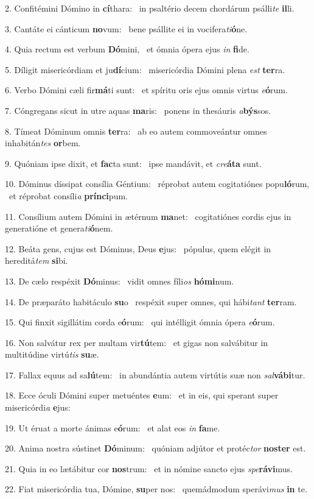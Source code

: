 2. Confitémini Dómino in \textbf{cí}thara: \ast\  in psaltério decem chordárum psálli\textit{te} \textbf{il}li.\

3. Cantáte ei cánticum \textbf{no}vum: \ast\  bene psállite ei in vocifera\textit{ti}\textbf{ó}ne.\

4. Quia rectum est verbum \textbf{Dó}mini, \ast\  et ómnia ópera ejus \textit{in} \textbf{fi}de.\

5. Díligit misericórdiam et ju\textbf{dí}cium: \ast\  misericórdia Dómini plena \textit{est} \textbf{ter}ra.\

6. Verbo Dómini cæli fir\textbf{má}ti sunt: \ast\  et spíritu oris ejus omnis virtus \textit{e}\textbf{ó}rum.\

7. Cóngregans sicut in utre aquas \textbf{ma}ris: \ast\  ponens in thesáuris \textit{a}\textbf{býs}sos.\

8. Tímeat Dóminum omnis \textbf{ter}ra: \ast\  ab eo autem commoveántur omnes inhabitán\textit{tes} \textbf{or}bem.\

9. Quóniam ipse dixit, et \textbf{fac}ta sunt: \ast\  ipse mandávit, et \textit{cre}\textbf{á}\textbf{ta} sunt.\

10. Dóminus díssipat consília Géntium: \dag\  réprobat autem cogitatiónes popu\textbf{ló}rum, \ast\  et réprobat consíli\textit{a} \textbf{prín}\textbf{ci}pum.\

11. Consílium autem Dómini in ætérnum \textbf{ma}net: \ast\  cogitatiónes cordis ejus in generatióne et genera\textit{ti}\textbf{ó}nem.\

12. Beáta gens, cujus est Dóminus, Deus \textbf{e}jus: \ast\  pópulus, quem elégit in hereditá\textit{tem} \textbf{si}bi.\

13. De cælo respéxit \textbf{Dó}minus: \ast\  vidit omnes fíli\textit{os} \textbf{hó}\textbf{mi}num.\

14. De præparáto habitáculo \textbf{su}o \ast\  respéxit super omnes, qui hábi\textit{tant} \textbf{ter}ram.\

15. Qui finxit sigillátim corda e\textbf{ó}rum: \ast\  qui intélligit ómnia ópera \textit{e}\textbf{ó}rum.\

16. Non salvátur rex per multam vir\textbf{tú}tem: \ast\  et gigas non salvábitur in multitúdine virtú\textit{tis} \textbf{su}æ.\

17. Fallax equus ad sa\textbf{lú}tem: \ast\  in abundántia autem virtútis suæ non \textit{sal}\textbf{vá}\textbf{bi}tur.\

18. Ecce óculi Dómini super metuéntes \textbf{e}um: \ast\  et in eis, qui sperant super misericórdi\textit{a} \textbf{e}jus:\

19. Ut éruat a morte ánimas e\textbf{ó}rum: \ast\  et alat eos \textit{in} \textbf{fa}me.\

20. Anima nostra sústinet \textbf{Dó}minum: \ast\  quóniam adjútor et protéc\textit{tor} \textbf{nos}\textbf{ter} est.\

21. Quia in eo lætábitur cor \textbf{nos}trum: \ast\  et in nómine sancto ejus \textit{spe}\textbf{rá}\textbf{vi}mus.\

22. Fiat misericórdia tua, Dómine, \textbf{su}per nos: \ast\  quemádmodum sperávi\textit{mus} \textbf{in} te.\

